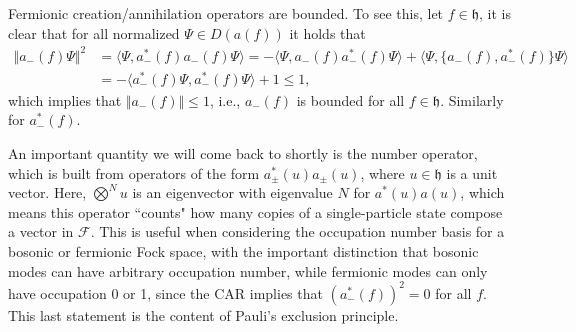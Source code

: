 \begin{remark}
	Fermionic creation/annihilation operators are bounded. To see this, let $f\in\mathfrak{h}$,
	it is clear that for all normalized $\Psi\in D(a(f))$ it holds that
	\begin{align*}
		\Vert a_-(f)\Psi\Vert^2 &= \langle\Psi,a^*_-(f)a_-(f)\Psi\rangle
		= -\langle\Psi,a_-(f)a^*_-(f)\Psi\rangle + \langle\Psi,\{a_-(f),a^*_-(f)\}\Psi\rangle \\
								&= -\langle a^*_-(f)\Psi,a^*_-(f)\Psi\rangle + 1 \leq 1,
	\end{align*}
	which implies that $\Vert a_-(f)\Vert \leq 1$, i.e., $a_-(f)$ is bounded for all
	$f\in\mathfrak{h}$. Similarly for $a^*_-(f)$.
\end{remark}

An important quantity we will come back to shortly is the number operator, which is built from
operators of the form $a^*_\pm(u)a_\pm(u)$, where $u\in\mathfrak{h}$ is a unit vector.
Here, $\bigotimes^N u$ is an eigenvector with eigenvalue $N$ for $a^*(u)a(u)$, which means
this operator ``counts" how many copies of a single-particle state compose a vector in
$\mathcal{F}$. This is useful when considering the occupation number basis for a bosonic or
fermionic Fock space, with the important distinction that bosonic modes can have arbitrary
occupation number, while fermionic modes can only have occupation 0 or 1, since the CAR
implies that $(a^*_-(f))^2=0$ for all $f$. This last statement is the content of Pauli's
exclusion principle.

